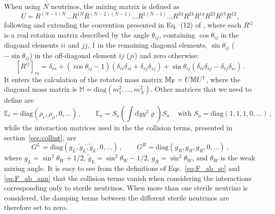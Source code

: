\documentclass[notitlepage,showpacs,preprintnumbers,amsmath,amssymb,superscriptaddress,prd,onecolumn]{revtex4-1}
\begin{document}
When using $N$ neutrinos,
the mixing matrix is defined as
%
\begin{equation}\label{eq:mixing_matrix_nxn}
U=R^{(N-1)N} \ldots R^{1N}
R^{(N-2)(N-1)}\ldots R^{1(N-1)}
\ldots
R^{34} R^{24} R^{14} R^{23} R^{13} R^{12},
\end{equation}
%
following and extending the convention presented in Eq.~(12) of \cite{Gariazzo:2015rra},
where each $R^{ij}$ is a real rotation matrix described by the angle $\theta_{ij}$,
containing $\cos\theta_{ij}$ in the diagonal elements $ii$ and $jj$,
1 in the remaining diagonal elements,
$\sin\theta_{ij}$ ($-\sin\theta_{ij}$) in the off-diagonal element $ij$ ($ji$)
and zero otherwise:
\begin{equation}
\label{eq:rotationmatrix}
[R^{ij}]_{rs}=
\delta_{rs}
+
(\cos\theta_{ij}-1)(\delta_{ri}\delta_{si}+\delta_{rj}\delta_{sj})
+
\sin\theta_{ij}(\delta_{ri}\delta_{sj}-\delta_{rj}\delta_{si})\,.
\end{equation}
It enters the calculation of the rotated mass matrix
$\mathbb{M}_{\rm F}=U\mathbb{M}U^\dagger$,
where the diagonal mass matrix is
$\mathbb{M}=\text{diag}(m_1^2,\ldots,m_N^2)$.
Other matrices that we need to define are
%
\begin{equation}\label{eq:matterpotentials_nxn}
\mathbb{E}_\ell=\text{diag}(\rho_e, \rho_\mu, 0, \ldots)\,,
\qquad
\mathbb{E}_\nu=S_a\left(\int \mathrm{d}y y^3\varrho\right) S_a\,
\quad\mbox{with }S_a=\text{diag}(1,1,1,0,\ldots)\,,
\end{equation}
while the interaction matrices used in the the collision terms,
presented in section~\ref{sec:collint}, are
\begin{equation}
G^L=\text{diag}(g_L, \tilde g_L, \tilde g_L, 0,\ldots)\,,
\qquad
G^R=\text{diag}(g_R, g_R, g_R, 0,\ldots)\,,
\end{equation}
%
where $g_L=\sin^2\theta_W+1/2$, $\tilde g_L=\sin^2\theta_W - 1/2$, $g_R=\sin^2\theta_W$,
and $\theta_W$ is the weak mixing angle.
It is easy to see from the definitions of Eqs.~\eqref{eq:F_ab_sc} and \eqref{eq:F_ab_ann}
that the collision terms vanish when considering the interactions corresponding
only to sterile neutrinos.
When more than one sterile neutrino is considered, the damping terms between the different sterile neutrinos are therefore set to zero.
\end{document}
